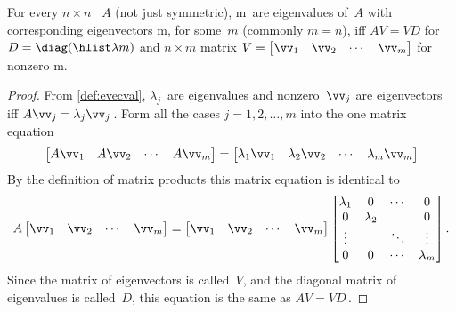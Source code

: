 \begin{theorem} \label{thm:avvd}
For every \(n\times n\) ~\(A\) (not just symmetric),
\hlist\lambda m\ are eigenvalues of~\(A\) with corresponding eigenvectors \hlist\vv m, for some~\(m\) (commonly \(m=n\)), iff \(AV=VD\) for  \(D=\diag(\hlist\lambda m)\) and \(n\times m\) matrix \(V=\begin{bmatrix} \vv_1&\vv_2&\cdots&\vv_m \end{bmatrix}\) for nonzero \hlist\vv m.
\end{theorem}

\begin{proof} 
From \cref{def:evecval}, \(\lambda_j\)~are eigenvalues and nonzero~\(\vv_j\) are eigenvectors iff \(A\vv_j=\lambda_j\vv_j\)\,.
Form all the cases \(j=1,2,\ldots,m\) into the one matrix equation
\begin{equation*}
\begin{bmatrix} A\vv_1&A\vv_2&\cdots&A\vv_m \end{bmatrix}
=\begin{bmatrix} \lambda_1\vv_1&\lambda_2\vv_2&\cdots&\lambda_m\vv_m \end{bmatrix}
\end{equation*}
By the definition of matrix products this matrix equation is identical to
\begin{equation*}
A\begin{bmatrix} \vv_1&\vv_2&\cdots&\vv_m \end{bmatrix}
=\begin{bmatrix} \vv_1&\vv_2&\cdots&\vv_m \end{bmatrix}
\begin{bmatrix} \lambda_1&0&\cdots&0
\\0&\lambda_2&&0
\\\vdots&&\ddots&\vdots
\\0&0&\cdots&\lambda_m \end{bmatrix}.
\end{equation*}
Since the matrix of eigenvectors is called~\(V\), and the diagonal matrix of eigenvalues is called~\(D\), this equation is the same as \(AV=VD\)\,.
\end{proof}




